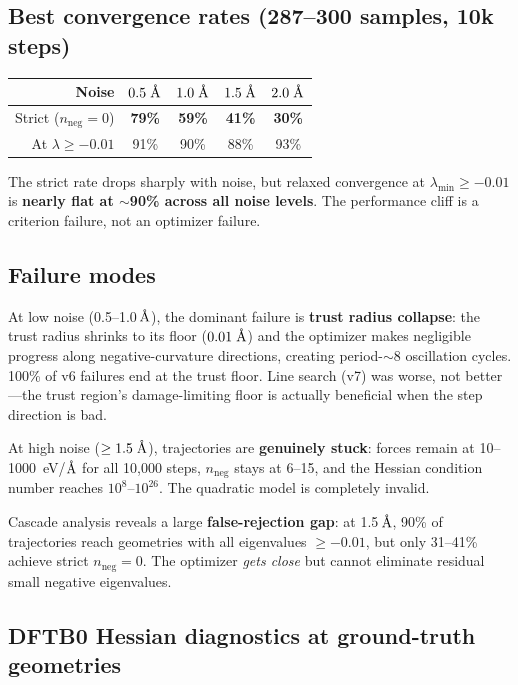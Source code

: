 \documentclass[11pt,a4paper]{article}
\newcommand{\eval}{\lambda}
\newcommand{\angstrom}{\text{\r{A}}}
\begin{document}
\subsection*{Best convergence rates (287--300 samples, 10k steps)}

\begin{center}
\begin{tabular}{rcccc}
\toprule
Noise & $0.5\;\angstrom$ & $1.0\;\angstrom$ & $1.5\;\angstrom$ & $2.0\;\angstrom$ \\
\midrule
Strict ($n_\text{neg}=0$) & \textbf{79\%} & \textbf{59\%} & \textbf{41\%} & \textbf{30\%} \\
At $\eval \geq -0.01$ & 91\% & 90\% & 88\% & 93\% \\
\bottomrule
\end{tabular}
\end{center}

The strict rate drops sharply with noise, but relaxed convergence at $\eval_\text{min} \geq -0.01$ is \textbf{nearly flat at $\sim$90\% across all noise levels}. The performance cliff is a criterion failure, not an optimizer failure.

\subsection*{Failure modes}

At low noise (0.5--1.0\,$\angstrom$), the dominant failure is \textbf{trust radius collapse}: the trust radius shrinks to its floor ($0.01\;\angstrom$) and the optimizer makes negligible progress along negative-curvature directions, creating period-$\sim$8 oscillation cycles. 100\% of v6 failures end at the trust floor. Line search (v7) was worse, not better---the trust region's damage-limiting floor is actually beneficial when the step direction is bad.

At high noise ($\geq 1.5\;\angstrom$), trajectories are \textbf{genuinely stuck}: forces remain at 10--1000~eV/$\angstrom$ for all 10,000 steps, $n_\text{neg}$ stays at 6--15, and the Hessian condition number reaches $10^{8}$--$10^{26}$. The quadratic model is completely invalid.

Cascade analysis reveals a large \textbf{false-rejection gap}: at 1.5\,$\angstrom$, 90\% of trajectories reach geometries with all eigenvalues $\geq -0.01$, but only 31--41\% achieve strict $n_\text{neg} = 0$. The optimizer \emph{gets close} but cannot eliminate residual small negative eigenvalues.

\subsection*{DFTB0 Hessian diagnostics at ground-truth geometries}
\end{document}
